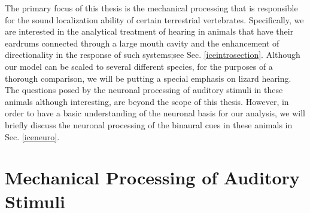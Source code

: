The primary focus of this thesis is the mechanical processing that is responsible for the
sound localization ability of certain terrestrial vertebrates. Specifically, we are interested
in the analytical treatment of hearing in animals that have their eardrums connected through a large mouth cavity and the
 enhancement of directionality in the response of such systems;see Sec. \ref{iceintrosection}. Although our model can be scaled to several different species,
 for the purposes of a thorough comparison, we will be putting a special emphasis on lizard hearing. The questions posed by the neuronal processing of auditory stimuli in these
animals although interesting, are beyond the scope of this thesis. However, in order to have a basic understanding of the neuronal basis for our analysis, we will briefly discuss the neuronal processing of the binaural cues
in these animals in Sec. \ref{iceneuro}.

\section{Mechanical Processing of Auditory Stimuli}\label{mechanicalprocessing}
